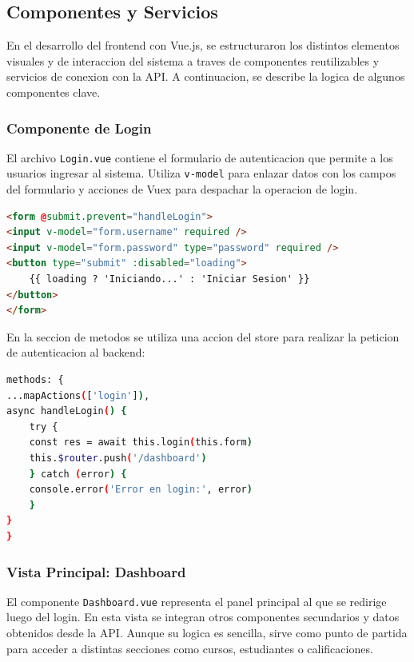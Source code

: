 \documentclass{article}
\begin{document}
    \subsection{Componentes y Servicios}
        En el desarrollo del frontend con Vue.js, se estructuraron los distintos elementos visuales y de interaccion del sistema a traves de componentes reutilizables y servicios de conexion con la API. A continuacion, se describe la logica de algunos componentes clave.

        \subsubsection*{Componente de Login}

        El archivo \texttt{Login.vue} contiene el formulario de autenticacion que permite a los usuarios ingresar al sistema. Utiliza \texttt{v-model} para enlazar datos con los campos del formulario y acciones de Vuex para despachar la operacion de login. 

        \begin{lstlisting}[language=HTML, caption={Formulario de Login (Login.vue)}]
<form @submit.prevent="handleLogin">
<input v-model="form.username" required />
<input v-model="form.password" type="password" required />
<button type="submit" :disabled="loading">
    {{ loading ? 'Iniciando...' : 'Iniciar Sesion' }}
</button>
</form>
        \end{lstlisting}

        En la seccion de metodos se utiliza una accion del store para realizar la peticion de autenticacion al backend:

        \begin{lstlisting}[language=bash, caption={Logica de Login}]
methods: {
...mapActions(['login']),
async handleLogin() {
    try {
    const res = await this.login(this.form)
    this.$router.push('/dashboard')
    } catch (error) {
    console.error('Error en login:', error)
    }
}
}
        \end{lstlisting}

        \subsubsection*{Vista Principal: Dashboard}

        El componente \texttt{Dashboard.vue} representa el panel principal al que se redirige luego del login. En esta vista se integran otros componentes secundarios y datos obtenidos desde la API. Aunque su logica es sencilla, sirve como punto de partida para acceder a distintas secciones como cursos, estudiantes o calificaciones.
\end{document}
